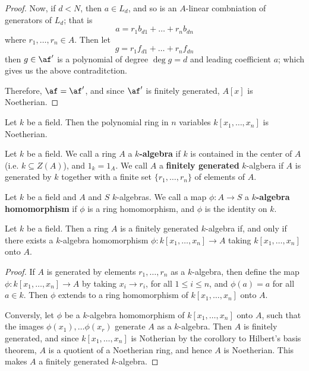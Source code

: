 \begin{proof}
     Now, if $d<N$, then  $a \in L_d$, and so is an  $A$-linear combniation of
     generators of  $L_d$; that is
     \begin{equation*}
         a=r_1b_{d1}+\dots+r_nb_{dn}
     \end{equation*}
     where $r_1, \dots, r_n \in A$. Then let
     \begin{equation*}
         g=r_1f_{d1}+\dots+r_nf_{dn}
     \end{equation*}
     then $g \in \af'$ is a polynomial of degree  $\deg{g}=d$ and leading
     coefficient $a$; which gives us the above contraditction.

     Therefore, $\af=\af'$, and since $\af'$ is finitely generated,  $A[x]$ is
     Noetherian.
 \end{proof}
 \begin{corollary}
     Let $k$ be a field. Then the polynomial ring in  $n$ variables  $k[x_1,
     \dots, x_n]$ is Noetherian.
 \end{corollary}

 \begin{definition}
     Let $k$ be a field. We call a ring  $A$ a  \textbf{$k$-algebra} if $k$ is
     contained in the center of  $A$  (i.e. $k \subseteq Z(A)$), and $1_k=1_A$.
     We call  $A$ a  \textbf{finitely generated} $k$-algbera if $A$ is generated
     by  $k$ together with a finite set $\{r_1, \dots, r_n\}$ of elements of
     $A$.
 \end{definition}

 \begin{definition}
     Let $k$ be a field and $A$ and  $S$  $k$-algebras. We call a map  $\phi:A
     \xrightarrow{} S$ a \textbf{$k$-algebra homomorphism} if $\phi$ is a ring
     homomorphism, and  $\phi$ is the identity on $k$.
 \end{definition}

 \begin{lemma}\label{1.12.4}
     Let $k$ be a field. Then a ring $A$ is a finitely generated $k$-algebra if,
     and only if there exists a $k$-algebra homomorphism $\phi:k[x_1, \dots,
     x_n] \xrightarrow{} A$ taking $k[x_1, \dots, x_n]$ onto $A$.
 \end{lemma}
 \begin{proof}
     If $A$ is generated by elements  $r_1, \dots, r_n$ as a $k$-algebra, then
     define the map $\phi:k[x_1, \dots, x_n] \xrightarrow{} A$ by taking $x_i
     \xrightarrow{} r_i$, for all $1 \leq i \leq n$, and  $\phi(a)=a$ for all $a
     \in k$. Then  $\phi$ extends to a ring homomorphism of  $k[x_1, \dots,
     x_n]$ onto $A$.

     Conversly, let  $\phi$ be a $k$-algebra homomorphism of $k[x_1, \dots,
     x_n]$ onto $A$,  such that the images $\phi(x_1), \dots \phi(x_r)$ generate
     $A$ as a  $k$-algebra. Then $A$ is finitely generated, and since  $k[x_1,
     \dots, x_n]$ is Notherian by the corollory to Hilbert's basis theorem, $A$
     is a quotient of a Noetherian ring, and hence  $A$ is Noetherian. This
     makes  $A$ a finitely generated  $k$-algebra.
 \end{proof}

